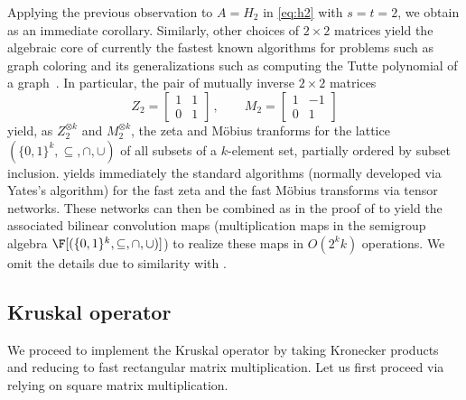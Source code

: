 Applying the previous observation to $A=H_2$ in \eqref{eq:h2} with $s=t=2$,
we obtain  as an immediate corollary. Similarly,
other choices of $2\times 2$ matrices yield the algebraic core of currently
the fastest known algorithms for problems such as graph coloring
and its generalizations such as computing the Tutte polynomial of
a graph~\cite{BjorklundHKK2007,BjorklundHKK2008,BjorklundHK2009}.
In particular, the pair of mutually inverse $2\times 2$ matrices
\[
Z_2=\left[\begin{array}{rr}
1&1\\
0&1
\end{array}\right]\,,\qquad
M_2=\left[\begin{array}{rr}
1&-1\\
0&1
\end{array}\right]
\]
yield, as $Z_2^{\otimes k}$ and $M_2^{\otimes k}$, the zeta and
M\"obius tranforms for the lattice $(\{0,1\}^k,\subseteq,\cap,\cup)$
of all subsets of a $k$-element set, partially ordered by subset inclusion.
 yields immediately the standard algorithms
(normally developed via Yates's algorithm)
for the fast zeta and the fast M\"obius transforms via tensor networks.
These networks can then be combined as in the proof of
 to yield the associated bilinear convolution maps
(multiplication maps in the semigroup algebra
$\F[(\{0,1\}^k,\subseteq,\cap,\cup)]$) to realize these maps in
$O(2^kk)$ operations. We omit the details due to similarity
with .



\subsection{Kruskal operator}

We proceed to implement the Kruskal operator by taking Kronecker products
and reducing to fast rectangular matrix multiplication. Let us first
proceed via  relying on square matrix multiplication.

